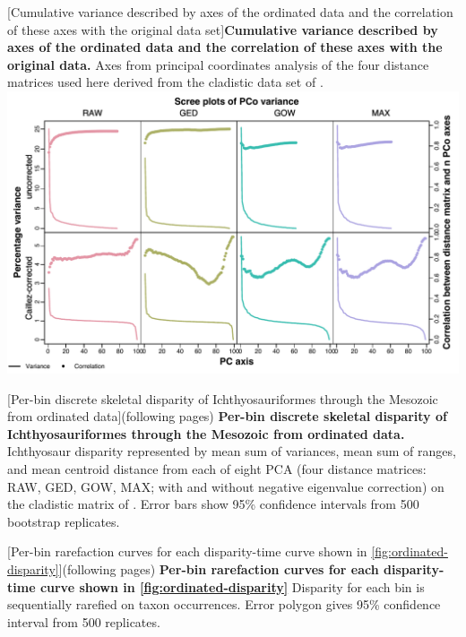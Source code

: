 \documentclass[british,a4paper]{article}
\begin{document}
[Cumulative variance described by axes of the ordinated data
    and the correlation of these axes with the original data
    set]{\textbf{Cumulative variance described by axes of the ordinated data and
    the correlation of these axes with the original data.} Axes from principal
    coordinates analysis of the four distance matrices used here derived from
    the cladistic data set of
    \textcite{Moon2018JSP}.\label{fig:ordination-correlation}}
\includegraphics[width = \textwidth]{supp_figures/figS4-scree_plot.pdf}

[Per-bin discrete skeletal disparity of Ichthyosauriformes through
    the Mesozoic from ordinated data]{(following pages) \textbf{Per-bin discrete
    skeletal disparity of Ichthyosauriformes through the Mesozoic from ordinated
    data.} Ichthyosaur disparity represented by mean sum of variances, mean sum
    of ranges, and mean centroid distance from each of eight PCA (four distance
    matrices: RAW, GED, GOW, MAX\@; with and without negative eigenvalue correction)
    on the cladistic matrix of \textcite{Moon2018JSP}. Error bars show 95\% confidence
    intervals from 500 bootstrap replicates.\label{fig:ordinated-disparity}}


[Per-bin rarefaction curves for each disparity-time curve shown in
    \cref{fig:ordinated-disparity}]{(following pages) \textbf{Per-bin
    rarefaction curves for each disparity-time curve shown in
    \cref{fig:ordinated-disparity}} Disparity for each bin is sequentially
    rarefied on taxon occurrences. Error polygon gives 95\% confidence interval from
    500 replicates.\label{fig:rarefaction-curves}}

\end{document}
